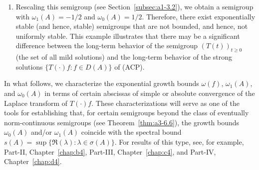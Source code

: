 \begin{example}
\begin{enumerate}[\upshape (i), wide, labelindent=.25em]
To see this, consider $E \coloneqq C_0(\R_{+}) \cap $ $L^{1}(\R_{+},\eu^{x}\dx)$. 
Then, as shown in Example~\ref{ex:a3-1.3} 
the translation semigroup satisfies $\|T(t)\| = 1$, and hence $\omega_{0}(A) = 0$. 
For every $\lambda \in \C$ with $\Re(\lambda) > -1$ and every $f \in E$, the resolvent of the generator is given as $R(\lambda,A)f = \int_{0}^{\infty} \eu^{\lambda t} T(t)f  \dt$.
From the Eq.~, it follows that
\[
T(t)f = \eu^{\lambda t}\left(f - \int_{0}^{t} \eu^{-\lambda s} T(s) (\lambda - A)f  \ds\right),
\]
and from the existence of the limit
\[
\lim_{t \to \infty} \int_{0}^{t} \eu^{-\lambda s} T(s) (\lambda - A)f  \ds,
\] 
it follows that 
$\|T(t)f\| \leq M\eu^{\lambda t}$ for every $f \in D(A)$ and some constant $M$ depending on $f$. This yields $\omega_{1}(A) \le -1 < 0 = \omega_{0}(A)$. 
Thus, we have a semigroup that is exponentially stable, but not uniformly exponentially stable.

\item
Rescaling this semigroup (see Section~\ref{subsec:a1-3.2}), we obtain a semigroup with $\omega_{1}(A) = -1/2 $ and $\omega_{0}(A) = 1/2 $.
Therefore, there exist exponentially stable (and hence, stable) semigroups that are not bounded, and hence, not uniformly stable.
This example illustrates that there may be a significant difference between the long-term behavior of the semigroup $(T(t))_{t \geq 0}$ (\ie the set of all mild solutions) and the long-term behavior of the strong solutions $\{T(\cdot)f \colon f \in D(A)\}$ of (ACP). 
\end{enumerate}
\end{example}
In what follows, we characterize the exponential growth bounds $\omega(f)$, $\omega_{1}(A)$, and $\omega_{0}(A)$ in terms of certain abscissas of simple or absolute convergence of the Laplace transform of\/ $T(\cdot)f$. 
These characterizations will serve as one of the tools for 
establishing that, for certain semigroups beyond the class of eventually norm-continuous semigroups (see Theorem~\ref{thm:a3-6.6}), the growth bounds $\omega_{0}(A)$ and/or $\omega_{1}(A)$ coincide with the spectral bound $s(A) = \sup\{\Re(\lambda)\colon\lambda \in \sigma(A)\}$. For results of this type, see, for example, Part-II, Chapter~\ref{chap:b4},  Part-III, Chapter~\ref{chap:c4},  and Part-IV, Chapter~\ref{chap:d4}.


